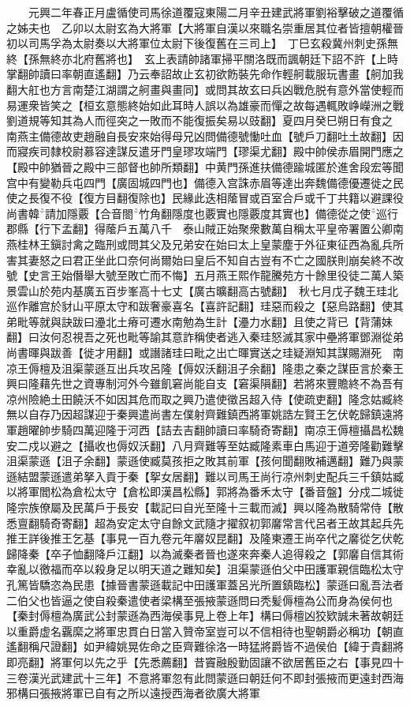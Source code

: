 　　元興二年春正月盧循使司馬徐道覆寇東陽二月辛丑建武將軍劉裕擊破之道覆循之姊夫也　乙卯以太尉玄為大將軍【大將軍自漢以來職名崇重居其位者皆擅朝權晉初以司馬孚為太尉奏以大將軍位太尉下後復舊在三司上】　丁巳玄殺冀州刺史孫無終【孫無終亦北府舊將也】　玄上表請帥諸軍掃平關洛既而諷朝廷下詔不許【上時掌翻帥讀曰率朝直遙翻】乃云奉詔故止玄初欲飭裝先命作輕舸載服玩書畫【舸加我翻大舡也方言南楚江湖謂之舸畫與畫同】或問其故玄曰兵凶戰危脱有意外當使輕而易運衆皆笑之【桓玄意態終始如此耳時人誤以為雄豪而憚之故每遇輒敗峥嶸洲之戰劉道規等知其為人而徑突之一敗而不能復振矣易以豉翻】夏四月癸巳朔日有食之　南燕主備德故吏趙融自長安來始得母兄凶問備德號慟吐血【號戶刀翻吐土故翻】因而寢疾司隸校尉慕容達謀反遣牙門皇璆攻端門【璆渠尤翻】殿中帥侯赤眉開門應之【殿中帥猶晉之殿中三部督也帥所類翻】中黄門孫進扶備德踰城匿於進舍段宏等聞宫中有變勒兵屯四門【廣固城四門也】備德入宫誅赤眉等達出奔魏備德優遷徙之民使之長復不役【復方目翻復除也】民緣此迭相䕃冒或百室合戶或千丁共籍以避課役尚書韓請加隱覈【合音閤竹角翻隱度也覈實也隱覈度其實也】備德從之使巡行郡縣【行下孟翻】得䕃戶五萬八千　泰山賊正始聚衆數萬自稱太平皇帝署置公卿南燕桂林王鎭討禽之臨刑或問其父及兄弟安在始曰太上皇蒙塵于外征東征西為亂兵所害其妻怒之曰君正坐此口奈何尚爾始曰皇后不知自古豈有不亡之國朕則崩矣終不改號【史言王始僭舉大號至敗亡而不悔】五月燕王熙作龍騰苑方十餘里役徒二萬人築景雲山於苑内基廣五百步峯高十七丈【廣古曠翻高古號翻】　秋七月戊子魏王珪北巡作離宫於豺山平原太守和跋奢豪喜名【喜許記翻】珪惡而殺之【惡烏路翻】使其弟毗等就與訣跋曰灅北土瘠可遷水南勉為生計【灅力水翻】且使之背已【背蒲妹翻】曰汝何忍視吾之死也毗等諭其意詐稱使者逃入秦珪怒滅其家中壘將軍鄧淵從弟尚書暉與跋善【徙才用翻】或譖諸珪曰毗之出亡暉實送之珪疑淵知其謀賜淵死　南凉王傉檀及沮渠蒙遜互出兵攻呂隆【傉奴沃翻沮子余翻】隆患之秦之謀臣言於秦王興曰隆藉先世之資專制河外今雖飢窘尚能自支【窘渠隕翻】若將來豐贍終不為吾有凉州險絶土田饒沃不如因其危而取之興乃遣使徵呂超入侍【使疏吏翻】隆念姑臧終無以自存乃因超謀迎于秦興遣尚書左僕射齊難鎮西將軍姚誥左賢王乞伏乾歸鎮遠將軍趙曜帥步騎四萬迎隆于河西【詰去吉翻帥讀曰率騎奇寄翻】南凉王傉檀攝昌松魏安二戍以避之【攝收也傉奴沃翻】八月齊難等至姑臧隆素車白馬迎于道旁隆勸難擊沮渠蒙遜【沮子余翻】蒙遜使臧莫孩拒之敗其前軍【孩何聞翻敗補邁翻】難乃與蒙遜結盟蒙遜遣弟拏入貢于秦【挐女居翻】難以司馬王尚行凉州刺史配兵三千鎮姑臧以將軍閻松為倉松太守【倉松即漢昌松縣】郭將為番禾太守【番音盤】分戍二城徙隆宗族僚屬及民萬戶于長安【載記曰自光至隆十三載而滅】興以隆為散騎常侍【散悉亶翻騎奇寄翻】超為安定太守自餘文武隨才擢叙初郭黁常言代呂者王故其起兵先推王詳後推王乞基【事見一百九卷元年黁奴昆翻】及隆東遷王尚卒代之黁從乞伏乾歸降秦【卒子恤翻降戶江翻】以為滅秦者晉也遂來奔秦人追得殺之【郭黁自信其術幸亂以徼福而卒以殺身足以明天道之難知矣】沮渠蒙遜伯父中田護軍親信臨松太守孔篤皆驕恣為民患【據晉書蒙遜載記中田護軍蓋呂光所置鎮臨松】蒙遜曰亂吾法者二伯父也皆逼之使自殺秦遣使者梁構至張掖蒙遜問曰秃髪傉檀為公而身為侯何也【秦封傉檀為廣武公封蒙遜為西海侯事見上卷上年】構曰傉檀凶狡欵誠未著故朝廷以重爵虚名覊縻之將軍忠貫白日當入贊帝室豈可以不信相待也聖朝爵必稱功【朝直遙翻稱尺證翻】如尹緯姚晃佐命之臣齊難徐洛一時猛將爵皆不過侯伯【緯于貴翻將即亮翻】將軍何以先之乎【先悉薦翻】昔竇融殷勤固讓不欲居舊臣之右【事見四十三卷漢光武建武十三年】不意將軍忽有此問蒙遜曰朝廷何不即封張掖而更遠封西海邪構曰張掖將軍已自有之所以遠授西海者欲廣大將軍